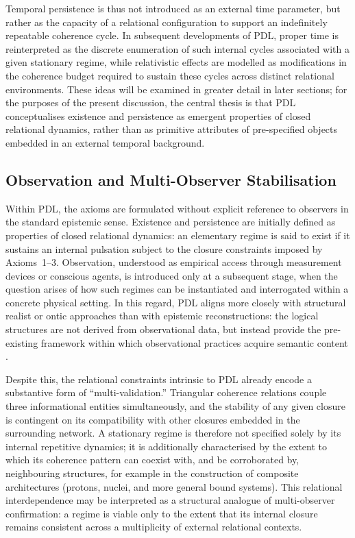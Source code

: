 \documentclass[11pt,a4paper]{article}
\begin{document}
Temporal persistence is thus not introduced as an external time parameter, but rather as the capacity of a relational configuration to support an indefinitely repeatable coherence cycle. In subsequent developments of PDL, proper time is reinterpreted as the discrete enumeration of such internal cycles associated with a given stationary regime, while relativistic effects are modelled as modifications in the coherence budget required to sustain these cycles across distinct relational environments. These ideas will be examined in greater detail in later sections; for the purposes of the present discussion, the central thesis is that PDL conceptualises existence and persistence as emergent properties of closed relational dynamics, rather than as primitive attributes of pre-specified objects embedded in an external temporal background.

\subsection{Observation and Multi-Observer Stabilisation}

Within PDL, the axioms are formulated without explicit reference to observers in the standard epistemic sense. Existence and persistence are initially defined as properties of closed relational dynamics: an elementary regime is said to exist if it sustains an internal pulsation subject to the closure constraints imposed by Axioms~1–3. Observation, understood as empirical access through measurement devices or conscious agents, is introduced only at a subsequent stage, when the question arises of how such regimes can be instantiated and interrogated within a concrete physical setting. In this regard, PDL aligns more closely with structural realist or ontic approaches than with epistemic reconstructions: the logical structures are not derived from observational data, but instead provide the pre-existing framework within which observational practices acquire semantic content \cite{Laubscher_PDL_long}.  

Despite this, the relational constraints intrinsic to PDL already encode a substantive form of “multi-validation.” Triangular coherence relations couple three informational entities simultaneously, and the stability of any given closure is contingent on its compatibility with other closures embedded in the surrounding network. A stationary regime is therefore not specified solely by its internal repetitive dynamics; it is additionally characterised by the extent to which its coherence pattern can coexist with, and be corroborated by, neighbouring structures, for example in the construction of composite architectures (protons, nuclei, and more general bound systems). This relational interdependence may be interpreted as a structural analogue of multi-observer confirmation: a regime is viable only to the extent that its internal closure remains consistent across a multiplicity of external relational contexts. 
\end{document}
